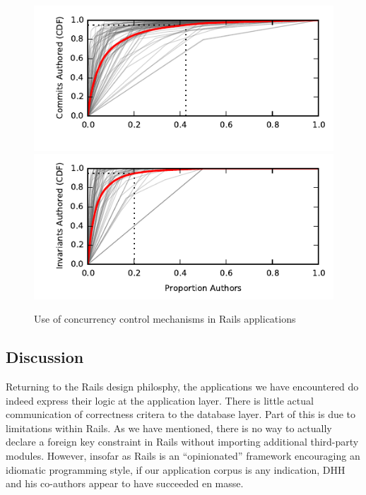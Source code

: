 \begin{figure}
  \newcommand{\skipht}{\\[-2em]}
\includegraphics[width=\columnwidth]{figs/commit-authorship-cdf.pdf}\vspace{-1em}
\includegraphics[width=\columnwidth]{figs/invariant-authorship-cdf.pdf}
\caption{Use of concurrency control mechanisms in Rails applications}
\label{fig:cdfs}
\end{figure}

\subsection{Discussion}

Returning to the Rails design philosphy, the applications we have
encountered do indeed express their logic at the application
layer. There is little actual communication of correctness critera to
the database layer. Part of this is due to limitations within
Rails. As we have mentioned, there is no way to actually declare a
foreign key constraint in Rails without importing additional
third-party modules. However, insofar as Rails is an ``opinionated''
framework encouraging an idiomatic programming style, if our
application corpus is any indication, DHH and his
co-authors appear to have succeeded en masse.

